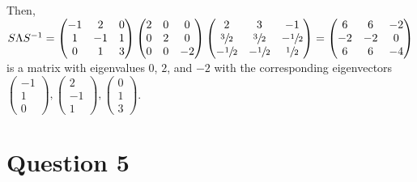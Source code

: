 \documentclass[12pt]{article}
\begin{document}
Then, $S\Lambda S^{-1}=\begin{pmatrix}
    -1 & 2 & 0 \\
    1 & -1 & 1 \\
    0 & 1 & 3
\end{pmatrix}
\begin{pmatrix}
    2 & 0 & 0 \\
    0 & 2 & 0 \\
    0 & 0 & -2 \\
\end{pmatrix}
\begin{pmatrix}
    2 & 3 & -1 \\
    \sfrac{3}{2} & \sfrac{3}{2} & -\sfrac{1}{2} \\
    -\sfrac{1}{2} & -\sfrac{1}{2} & \sfrac{1}{2}
\end{pmatrix}
= \begin{pmatrix}
     6 & 6  & -2 \\
    -2 & -2 & 0 \\
     6 & 6  & -4
\end{pmatrix}$ is a matrix with eigenvalues $0$, $2$, and $-2$ with the corresponding eigenvectors $\begin{pmatrix} -1 \\ 1 \\ 0 \end{pmatrix}, \begin{pmatrix} 2 \\ -1 \\ 1 \end{pmatrix}, \begin{pmatrix} 0 \\ 1 \\ 3 \end{pmatrix}$.

\section*{Question 5}
\end{document}
